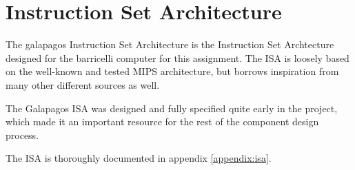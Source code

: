 \section{Instruction Set Architecture} \label{fpga:isa:s:isa}

The \Gls{galapagos} Instruction Set Architecture is the Instruction Set Archtecture designed for the \Gls{barricelli} computer for this assignment.
The ISA is loosely based on the well-known and tested MIPS architecture\cn, but borrows inspiration from many other different sources as well.

The Galapagos ISA was designed and fully specified quite early in the project, which made it an important resource for the rest of the component design process.

The ISA is thoroughly documented in appendix \vref{appendix:isa}.
